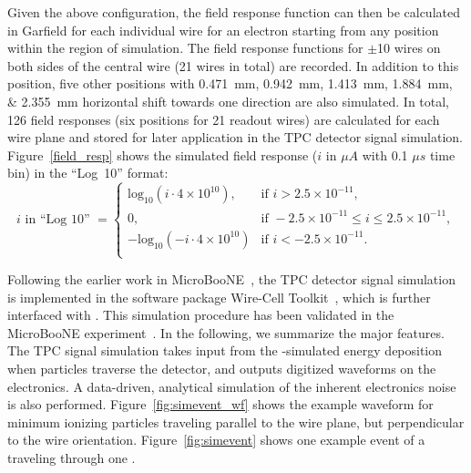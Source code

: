  Given the above configuration, the field response function can then be calculated in Garfield
  for each individual wire  for an
  electron starting from any position within the region of simulation. 
  The field response functions for $\pm$10 wires on both sides of the central wire (21 wires in total) are 
  recorded. In addition to this position, five other positions with
  \SIlist{0.471;0.942;1.413;1.884;2.355}{\mm} horizontal shift towards one direction are also simulated.
  In total, 126 field responses (six positions for 21 readout wires) are calculated for each wire plane and stored for later
  application in the TPC detector signal simulation.
  Figure~\ref{field_resp} shows the simulated field response ($i$ in $\mu A$ with 0.1 $\mu s$ time bin) 
   in the ``Log~10'' format:
   \begin{equation}\label{eq:log10}
    i \text{ in ``Log 10'' } =
    \begin{cases}
      \text{log}_{10}(i\cdot4\times10^{10}),& \text{if }i>2.5\times10^{-11},\\
      0,& \text{if }  -2.5 \times10^{-11} \leq i \leq 2.5 \times 10^{-11},\\
      -\text{log}_{10}(- i\cdot4\times10^{10})& \text{if }i<-2.5\times10^{-11}.\\
      \end{cases}
  \end{equation}
  
  Following the earlier work in MicroBooNE~\cite{Adams:2018dra}, the TPC detector signal simulation
  is implemented in the software package Wire-Cell Toolkit~\cite{ref:wire_cell_toolkit,ref:full_simulation}, which is 
  further interfaced with . This simulation procedure has been validated in the MicroBooNE experiment~\cite{Adams:2018gbi}. In
  the following, we summarize the major features. The TPC signal simulation takes input from the -simulated energy deposition when particles traverse the detector, and outputs digitized waveforms on the  electronics.
   A data-driven, analytical simulation of the inherent electronics noise is also performed. 
Figure~\ref{fig:simevent_wf} shows the example waveform for minimum ionizing particles traveling parallel to 
the wire plane, but perpendicular to the wire orientation.  Figure~\ref{fig:simevent} shows one example event of 
a  traveling through one . 

